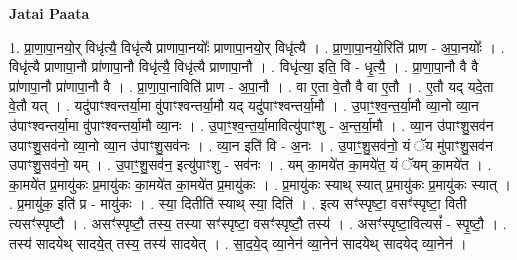\documentclass[17pt]{extarticle}
\begin{document}
\textbf{Jatai Paata} \newline

1. प्रा॒णा॒पा॒नयो॒र् विधृ॑त्यै॒ विधृ॑त्यै प्राणापा॒नयोः᳚ प्राणापा॒नयो॒र् विधृ॑त्यै । . प्रा॒णा॒पा॒नयो॒रिति॑ प्राण - अ॒पा॒नयोः᳚ । . विधृ॑त्यै प्राणापा॒नौ प्रा॑णापा॒नौ विधृ॑त्यै॒ विधृ॑त्यै प्राणापा॒नौ । . विधृ॑त्या॒ इति॒ वि - धृ॒त्यै॒ । . प्रा॒णा॒पा॒नौ वै वै प्रा॑णापा॒नौ प्रा॑णापा॒नौ वै । . प्रा॒णा॒पा॒नाविति॑ प्राण - अ॒पा॒नौ । . वा ए॒ता वे॒तौ वै वा ए॒तौ । . ए॒तौ यद् यदे॒ता वे॒तौ यत् । . यदु॑पाꣳश्वन्तर्या॒मा वु॑पाꣳश्वन्तर्या॒मौ यद् यदु॑पाꣳश्वन्तर्या॒मौ । . उ॒पाꣳ॒॒श्व॒न्त॒र्या॒मौ व्या॒नो व्या॒न उ॑पाꣳश्वन्तर्या॒मा वु॑पाꣳश्वन्तर्या॒मौ व्या॒नः । . उ॒पाꣳ॒॒श्व॒न्त॒र्या॒मावित्यु॑पाꣳशु - अ॒न्त॒र्या॒मौ । . व्या॒न उ॑पाꣳशु॒सव॑न उपाꣳशु॒सव॑नो व्या॒नो व्या॒न उ॑पाꣳशु॒सव॑नः । . व्या॒न इति॑ वि - अ॒नः । . उ॒पाꣳ॒॒शु॒सव॑नो॒ यं ॅय मु॑पाꣳशु॒सव॑न उपाꣳशु॒सव॑नो॒ यम् । . उ॒पाꣳ॒॒शु॒सव॑न॒ इत्यु॑पाꣳशु - सव॑नः । . यम् का॒मये॑त का॒मये॑त॒ यं ॅयम् का॒मये॑त । . का॒मये॑त प्र॒मायु॑कः प्र॒मायु॑कः का॒मये॑त का॒मये॑त प्र॒मायु॑कः । . प्र॒मायु॑कः स्याथ् स्यात् प्र॒मायु॑कः प्र॒मायु॑कः स्यात् । . प्र॒मायु॑क॒ इति॑ प्र - मायु॑कः । . स्या॒ दितीति॑ स्याथ् स्या॒ दिति॑ । . इत्य सꣳ॑स्पृष्टा॒ वसꣳ॑स्पृष्टा॒ विती त्यसꣳ॑स्पृष्टौ । . असꣳ॑स्पृष्टौ॒ तस्य॒ तस्या सꣳ॑स्पृष्टा॒ वसꣳ॑स्पृष्टौ॒ तस्य॑ । . असꣳ॑स्पृष्टा॒वित्यसं᳚ - स्पृ॒ष्टौ॒ । . तस्य॑ सादयेथ् सादये॒त् तस्य॒ तस्य॑ सादयेत् । . सा॒द॒ये॒द् व्या॒नेन॑ व्या॒नेन॑ सादयेथ् सादयेद् व्या॒नेन॑ । \newline
\end{document}
